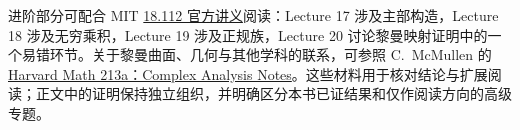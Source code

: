 进阶部分可配合 MIT \href{https://ocw.mit.edu/courses/18-112-functions-of-a-complex-variable-fall-2008/pages/lecture-notes/}{18.112 官方讲义}阅读：Lecture 17 涉及主部构造，Lecture 18 涉及无穷乘积，Lecture 19 涉及正规族，Lecture 20 讨论黎曼映射证明中的一个易错环节。关于黎曼曲面、几何与其他学科的联系，可参照 C.~McMullen 的\href{https://abel.math.harvard.edu/~ctm/home/text/class/harvard/213a/06/html/home/course/course.pdf}{Harvard Math 213a：Complex Analysis Notes}。这些材料用于核对结论与扩展阅读；正文中的证明保持独立组织，并明确区分本书已证结果和仅作阅读方向的高级专题。


